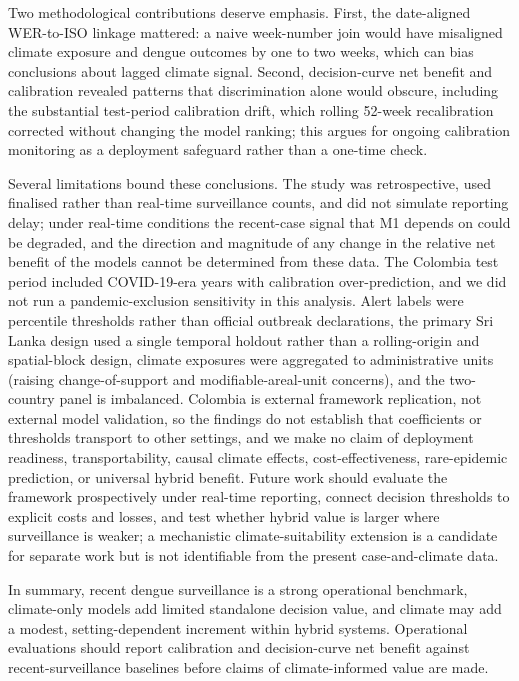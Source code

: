 \documentclass[11pt,a4paper]{article}
\begin{document}
Two methodological contributions deserve emphasis. First, the date-aligned WER-to-ISO linkage mattered: a naive week-number join would have misaligned climate exposure and dengue outcomes by one to two weeks, which can bias conclusions about lagged climate signal. Second, decision-curve net benefit and calibration revealed patterns that discrimination alone would obscure, including the substantial test-period calibration drift, which rolling 52-week recalibration corrected without changing the model ranking; this argues for ongoing calibration monitoring as a deployment safeguard rather than a one-time check.

Several limitations bound these conclusions. The study was retrospective, used finalised rather than real-time surveillance counts, and did not simulate reporting delay; under real-time conditions the recent-case signal that M1 depends on could be degraded, and the direction and magnitude of any change in the relative net benefit of the models cannot be determined from these data. The Colombia test period included COVID-19-era years with calibration over-prediction, and we did not run a pandemic-exclusion sensitivity in this analysis. Alert labels were percentile thresholds rather than official outbreak declarations, the primary Sri Lanka design used a single temporal holdout rather than a rolling-origin and spatial-block design, climate exposures were aggregated to administrative units (raising change-of-support and modifiable-areal-unit concerns), and the two-country panel is imbalanced. Colombia is external framework replication, not external model validation, so the findings do not establish that coefficients or thresholds transport to other settings, and we make no claim of deployment readiness, transportability, causal climate effects, cost-effectiveness, rare-epidemic prediction, or universal hybrid benefit. Future work should evaluate the framework prospectively under real-time reporting, connect decision thresholds to explicit costs and losses, and test whether hybrid value is larger where surveillance is weaker; a mechanistic climate-suitability extension is a candidate for separate work but is not identifiable from the present case-and-climate data.

In summary, recent dengue surveillance is a strong operational benchmark, climate-only models add limited standalone decision value, and climate may add a modest, setting-dependent increment within hybrid systems. Operational evaluations should report calibration and decision-curve net benefit against recent-surveillance baselines before claims of climate-informed value are made.
\end{document}

